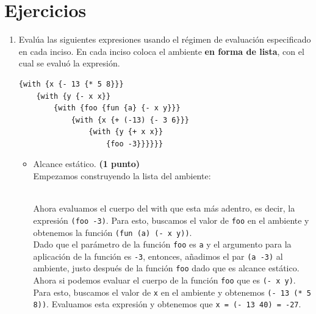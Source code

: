 \documentclass[11pt]{article}
\begin{document}
\section*{Ejercicios}

\begin{enumerate}[leftmargin=0.8cm]

    \item Evalúa las siguientes expresiones usando el régimen de evaluación especificado en cada inciso. En cada inciso coloca el ambiente \textbf{en forma de lista}, con el cual se evaluó la expresión.
    \begin{lstlisting}
{with {x {- 13 {* 5 8}}}
    {with {y {- x x}}
        {with {foo {fun {a} {- x y}}}
            {with {x {+ (-13) {- 3 6}}}
                {with {y {+ x x}}
                    {foo -3}}}}}}
    \end{lstlisting}
    \begin{itemize}
        \item Alcance estático. \textbf{(1 punto)}\\
            Empezamos construyendo la lista del ambiente:\\
            \hspace*{-0.5cm}
            \\
            Ahora evaluamos el cuerpo del with que esta más adentro, es decir, la expresión \texttt{(foo -3)}. Para esto, buscamos el valor de \texttt{foo} en el ambiente y obtenemos la función \texttt{(fun (a) (- x y))}.\\ 
            Dado que el parámetro de la función \texttt{foo} es \texttt{a} y el argumento para la aplicación de la función es \texttt{-3}, entonces, añadimos el par \texttt{(a -3)} al ambiente, justo después de la función \texttt{foo} dado que es alcance estático.\\
            Ahora si podemos evaluar el cuerpo de la función \texttt{foo} que es \texttt{(- x y)}. Para esto, buscamos el valor de \texttt{x} en el ambiente y obtenemos \texttt{(- 13 (* 5 8))}. Evaluamos esta expresión y obtenemos que \texttt{x = (- 13 40) = -27}.\\

\end{itemize}
\end{enumerate}
\end{document}
